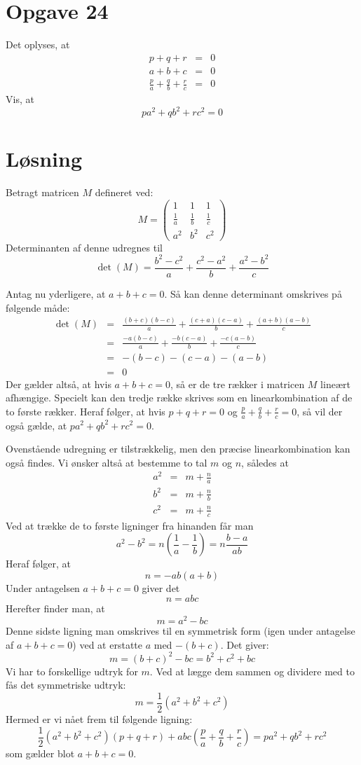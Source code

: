\documentclass[12pt,oneside,a4paper]{article}
\newcommand{\bas}{\begin{eqnarray*}}
\newcommand{\eas}{\end{eqnarray*}}
\begin{document}
\section{Opgave 24}
Det oplyses, at
\bas
p+q+r &=& 0 \\
a+b+c &=& 0 \\
\frac{p}{a} + \frac{q}{b} + \frac{r}{c} &=& 0
\eas
Vis, at
$$
pa^2+qb^2+rc^2=0
$$

\section{Løsning}
Betragt matricen $M$ defineret ved:
$$
M = \left(\begin{array}{ccc}
    1 & 1 & 1 \\
    \frac{1}{a} & \frac{1}{b} & \frac{1}{c} \\
    a^2 & b^2 & c^2 
\end{array}
\right)
$$
Determinanten af denne udregnes til
$$
\det(M) = \frac{b^2-c^2}{a} + \frac{c^2-a^2}{b} + \frac{a^2-b^2}{c}
$$

Antag nu yderligere, at $a+b+c=0$. Så kan denne determinant omskrives på følgende måde:
\bas
\det(M) &=& \frac{(b+c)(b-c)}{a} + \frac{(c+a)(c-a)}{b} + \frac{(a+b)(a-b)}{c} \\
        &=& \frac{-a(b-c)}{a} + \frac{-b(c-a)}{b} + \frac{-c(a-b)}{c} \\
        &=& -(b-c) - (c-a) - (a-b) \\
        &=& 0
\eas
Der gælder altså, at hvis $a+b+c=0$, så er de tre rækker i matricen $M$ lineært afhængige. Specielt kan den tredje række skrives som en linearkombination af de to første rækker.
Heraf følger, at hvis $p+q+r=0$ og $\frac{p}{a} + \frac{q}{b} + \frac{r}{c}=0$, så vil der også gælde, at $pa^2+qb^2+rc^2=0$.

Ovenstående udregning er tilstrækkelig, men den præcise linearkombination kan også findes. Vi ønsker altså at bestemme to tal $m$ og $n$, således at
\bas
a^2 &=& m+\frac{n}{a} \\
b^2 &=& m+\frac{n}{b} \\
c^2 &=& m+\frac{n}{c} 
\eas
Ved at trække de to første ligninger fra hinanden får man
$$
a^2-b^2 = n\left(\frac{1}{a}-\frac{1}{b}\right) = n \frac{b-a}{ab}
$$
Heraf følger, at 
$$
n = -ab(a+b)
$$
Under antagelsen $a+b+c=0$ giver det
$$
n=abc
$$
Herefter finder man, at
$$
m=a^2-bc
$$
Denne sidste ligning man omskrives til en symmetrisk form (igen under antagelse af $a+b+c=0$) ved at erstatte $a$ med $-(b+c)$. Det giver:
$$
m=(b+c)^2-bc = b^2+c^2+bc
$$
Vi har to forskellige udtryk for $m$. Ved at lægge dem sammen og dividere med to fås det symmetriske udtryk:
$$
m=\frac{1}{2} (a^2+b^2+c^2)
$$
Hermed er vi nået frem til følgende ligning:
$$
\frac{1}{2} (a^2+b^2+c^2) (p+q+r) + abc \left(\frac{p}{a} + \frac{q}{b} + \frac{r}{c} \right) = pa^2+qb^2+rc^2
$$
som gælder blot $a+b+c=0$.
\end{document}
